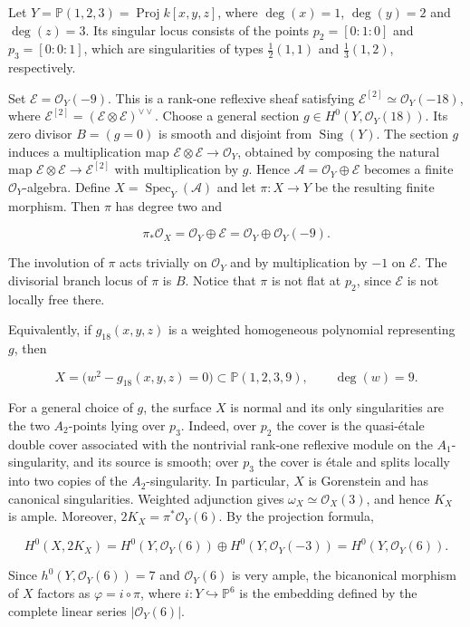 \documentclass[11pt,twoside]{amsart}
\theoremstyle{plain}
\numberwithin{equation}{section}
\theoremstyle{definition}
\begin{document}
Let $Y=\mathbb P(1,2,3)=\operatorname{Proj} k[x,y,z]$, where $\deg(x)=1$, $\deg(y)=2$ and $\deg(z)=3$. Its singular locus consists of the points $p_2=[0:1:0]$ and $p_3=[0:0:1]$, which are singularities of types $\frac{1}{2}(1,1)$ and $\frac{1}{3}(1,2)$, respectively.

Set $\mathcal E=\mathcal O_Y(-9)$. This is a rank-one reflexive sheaf satisfying $\mathcal E^{[2]}\simeq\mathcal O_Y(-18)$, where $\mathcal E^{[2]}=(\mathcal E\otimes\mathcal E)^{\vee\vee}$. Choose a general section $g\in H^0(Y,\mathcal O_Y(18))$. Its zero divisor $B=(g=0)$ is smooth and disjoint from $\operatorname{Sing}(Y)$. The section $g$ induces a multiplication map $\mathcal E\otimes\mathcal E\longrightarrow\mathcal O_Y$, obtained by composing the natural map $\mathcal E\otimes\mathcal E\to\mathcal E^{[2]}$ with multiplication by $g$. Hence $\mathcal A=\mathcal O_Y\oplus\mathcal E$ becomes a finite $\mathcal O_Y$-algebra. Define $X=\operatorname{Spec}_Y(\mathcal A)$ and let $\pi:X\to Y$ be the resulting finite morphism. Then $\pi$ has degree two and

$$
\pi_*\mathcal O_X=\mathcal O_Y\oplus\mathcal E
=\mathcal O_Y\oplus\mathcal O_Y(-9).
$$

The involution of $\pi$ acts trivially on $\mathcal O_Y$ and by multiplication by $-1$ on $\mathcal E$. The divisorial branch locus of $\pi$ is $B$. Notice that $\pi$ is not flat at $p_2$, since $\mathcal E$ is not locally free there.

Equivalently, if $g_{18}(x,y,z)$ is a weighted homogeneous polynomial representing $g$, then

$$
X=\bigl(w^2-g_{18}(x,y,z)=0\bigr)
\subset\mathbb P(1,2,3,9),
\qquad \deg(w)=9.
$$

For a general choice of $g$, the surface $X$ is normal and its only singularities are the two $A_2$-points lying over $p_3$. Indeed, over $p_2$ the cover is the quasi-étale double cover associated with the nontrivial rank-one reflexive module on the $A_1$-singularity, and its source is smooth; over $p_3$ the cover is étale and splits locally into two copies of the $A_2$-singularity. In particular, $X$ is Gorenstein and has canonical singularities. Weighted adjunction gives $\omega_X\simeq\mathcal O_X(3)$, and hence $K_X$ is ample. Moreover, $2K_X=\pi^*\mathcal O_Y(6)$. By the projection formula,

$$
H^0(X,2K_X)
= H^0(Y,\mathcal O_Y(6))
\oplus
H^0(Y,\mathcal O_Y(-3))
= H^0(Y,\mathcal O_Y(6)).
$$

Since $h^0(Y,\mathcal O_Y(6))=7$ and $\mathcal O_Y(6)$ is very ample, the bicanonical morphism of $X$ factors as $\varphi=i\circ\pi$, where $i:Y\hookrightarrow\mathbb P^6$ is the embedding defined by the complete linear series $|\mathcal O_Y(6)|$.
\end{document}
